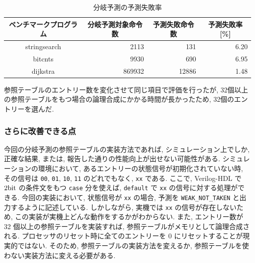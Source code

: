\documentclass[../improvements.tex]{subflies}
\begin{document}
  \begin{table}[]
    \centering
    \begin{tabular}{|c|r|r|r|}
    \hline
    ベンチマークプログラム & \multicolumn{1}{c|}{分岐予測対象命令数} & \multicolumn{1}{c|}{予測失敗命令数} & \multicolumn{1}{c|}{予測失敗率 {[}\%{]}} \\ \hline
    stringsearch & 2113 & 131 & 6.20 \\
    bitcnts & 9930 & 690 & 6.95 \\
    dijkstra & 869932 & 12886 & 1.48 \\ \hline
    \end{tabular}
    \caption{分岐予測の予測失敗率}
    \label{table:miss-rate}
  \end{table}

  参照テーブルのエントリー数を変化させて同じ項目で評価を行ったが, 
  32個以上の参照テーブルをもつ場合の論理合成にかかる時間が長かったため, 
  32個のエントリーを選んだ.

  \subsubsection{さらに改善できる点}
  今回の分岐予測の参照テーブルの実装方法であれば, 
  シミュレーション上でしか, 正確な結果, または, 報告した通りの性能向上が出せない可能性がある.
  シミュレーションの環境において, あるエントリーの状態信号が初期化されていない時, 
  その信号は \verb|00|, \verb|01|, \verb|10|, \verb|11| のどれでもなく, \verb|xx| である.
  ここで, Verilog-HDL で $2\unit{\bit}$ の条件文をもつ \verb|case| 分を使えば, 
  \verb|default| で \verb|xx| の信号に対する処理ができる.
  今回の実装において, 状態信号が \verb|xx| の場合, 
  予測を \verb|WEAK_NOT_TAKEN| と出力するように記述している.
  しかしながら, 実機では \verb|xx| の信号が存在しないため, 
  この実装が実機上どんな動作をするかがわからない.
  また, エントリー数が 32 個以上の参照テーブルを実装すれば, 
  参照テーブルがメモリとして論理合成される.
  プロセッサのリセット時に全てのエントリーを 0 にリセットすることが現実的ではない.
  そのため, 参照テーブルの実装方法を変えるか, 参照テーブルを使わない実装方法に変える必要がある.
\end{document}
